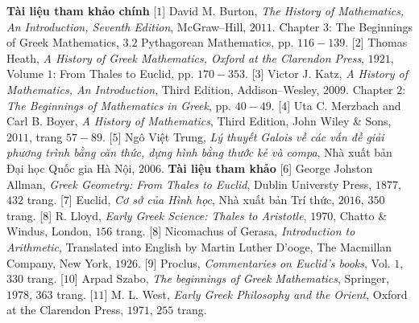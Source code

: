 \begin{multicols}{2}
	\vskip 0.1cm
	\textbf{\color{lichsutoanhoc}Tài liệu tham khảo chính}
	\vskip 0.1cm
	[$1$] David M. Burton, \textit{The History of Mathematics, An Introduction, Seventh Edition}, McGraw--Hill, $2011$. Chapter $3$: The Beginnings of Greek Mathematics, $3.2$ Pythagorean Mathematics, pp. $116-139$.
	\vskip 0.1cm
	[$2$] Thomas Heath, \textit{A History of Greek Mathematics, Oxford at the Clarendon Press}, $1921$, Volume $1$: From Thales to Euclid, pp. $170-353$.
	\vskip 0.1cm   
	[$3$] Victor J. Katz, \textit{A History of Mathematics, An Introduction}, Third Edition, Addison--Wesley, $2009$. Chapter $2$: \textit{The Beginnings of Mathematics in Greek}, pp. $40-49$.
	\vskip 0.1cm
	[$4$] Uta C. Merzbach and Carl B. Boyer, \textit{A
	History of Mathematics}, Third Edition, John Wiley \& Sons, $2011$, trang $57-89$.
	\vskip 0.1cm
	[$5$] Ngô Việt Trung, \textit{Lý thuyết Galois về các vấn đề giải phương trình bằng căn thức, dựng hình bằng thước kẻ và compa}, Nhà xuất bản Đại học Quốc gia Hà Nội, $2006$.
	\vskip 0.1cm
	\textbf{\color{lichsutoanhoc}Tài liệu tham khảo}
	\vskip 0.1cm 
	[$6$] George Johston Allman, \textit{Greek Geometry: From Thales to Euclid}, Dublin Universty Press, $1877$, $432$ trang.  
	\vskip 0.1cm
	[$7$] Euclid, \textit{Cơ sở của Hình học}, Nhà xuất bản Trí thức, $2016$, $350$ trang.
	\vskip 0.1cm
	[$8$] R. Lloyd, \textit{Early Greek Science: Thales to Aristotle}, $1970$, Chatto \& Windus, London, $156$ trang. 
	\vskip 0.1cm
	[$8$] Nicomachus of Gerasa, \textit{Introduction to Arithmetic}, Translated into English by Martin Luther D’ooge, The Macmillan Company, New York, $1926$.
	\vskip 0.1cm
	[$9$] Proclus, \textit{Commentaries on Euclid’s books}, Vol. $1$, $330$ trang.
	\vskip 0.1cm
	[$10$] Arpad Szabo, \textit{The beginnings of Greek Mathematics}, Springer, $1978$, $363$ trang.
	\vskip 0.1cm
	[$11$] M. L. West, \textit{Early Greek Philosophy and the Orient}, Oxford at the Clarendon Press, $1971$, $255$ trang.
\end{multicols}